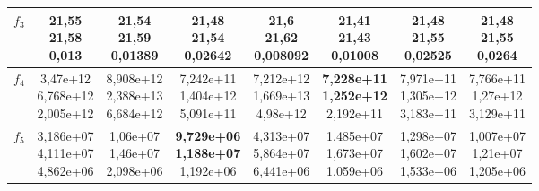 \begin{table}[t]
\begin{small}
\begin{tabular}{|c|c|c|c|c|c|c|c|}
        $f_3$    & \makecell{21,55 \\ 21,58 \\ 0,013}             & \makecell{21,54 \\ 21,59 \\ 0,01389}           & \makecell{21,48 \\ 21,54 \\ 0,02642}           & \makecell{21,6 \\ 21,62 \\ 0,008092}             & \makecell{\textbf{21,41} \\ \textbf{21,43} \\ 0,01008}        & \makecell{21,48 \\ 21,55 \\ 0,02525}           & \makecell{21,48 \\ 21,55 \\ 0,0264}            \\\hline
        $f_4$    & \makecell{3,47e+12 \\ 6,768e+12 \\ 2,005e+12}  & \makecell{8,908e+12 \\ 2,388e+13 \\ 6,684e+12} & \makecell{7,242e+11 \\ 1,404e+12 \\ 5,091e+11} & \makecell{7,212e+12 \\ 1,669e+13 \\ 4,98e+12}  & \makecell{\textbf{7,228e+11} \\ \textbf{1,252e+12} \\ 2,192e+11} & \makecell{7,971e+11 \\ 1,305e+12 \\ 3,183e+11} & \makecell{7,766e+11 \\ 1,27e+12 \\ 3,129e+11}  \\\hline
        $f_5$    & \makecell{3,186e+07 \\ 4,111e+07 \\ 4,862e+06} & \makecell{1,06e+07 \\ 1,46e+07 \\ 2,098e+06}   & \makecell{\textbf{9,729e+06} \\ \textbf{1,188e+07} \\ 1,192e+06} & \makecell{4,313e+07 \\ 5,864e+07 \\ 6,441e+06} & \makecell{1,485e+07 \\ 1,673e+07 \\ 1,059e+06} & \makecell{1,298e+07 \\ 1,602e+07 \\ 1,533e+06} & \makecell{1,007e+07 \\ 1,21e+07 \\ 1,205e+06}  \\\hline

\end{tabular}
\end{small}
\end{table}

